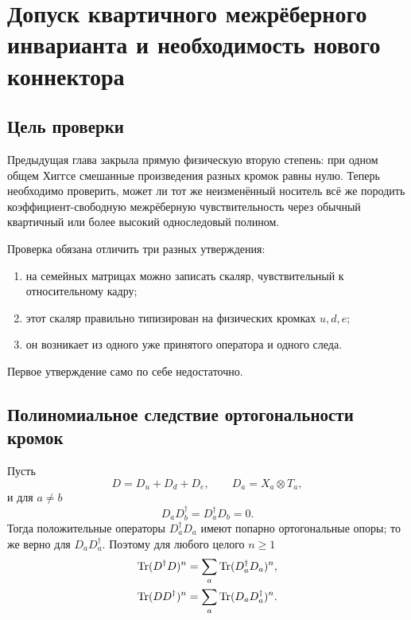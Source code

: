 \chapter{Допуск квартичного межрёберного инварианта и необходимость нового коннектора}

\section{Цель проверки}

Предыдущая глава закрыла прямую физическую вторую степень: при одном общем
Хиггсе смешанные произведения разных кромок равны нулю. Теперь необходимо
проверить, может ли тот же неизменённый носитель всё же породить
коэффициент-свободную межрёберную чувствительность через обычный
квартичный или более высокий односледовый полином.

Проверка обязана отличить три разных утверждения:
\begin{enumerate}
 \item на семейных матрицах можно записать скаляр, чувствительный к
 относительному кадру;
 \item этот скаляр правильно типизирован на физических кромках $u,d,e$;
 \item он возникает из одного уже принятого оператора и одного следа.
\end{enumerate}
Первое утверждение само по себе недостаточно.

\section{Полиномиальное следствие ортогональности кромок}

Пусть
\begin{equation}
 D=D_u+D_d+D_e,
 \qquad
 D_a=X_a\otimes T_a,
 \label{eq:v7-quartic-total-edge-operator}
\end{equation}
и для $a\ne b$
\begin{equation}
 D_aD_b^\dagger=D_a^\dagger D_b=0.
 \label{eq:v7-quartic-input-orthogonality}
\end{equation}
Тогда положительные операторы $D_a^\dagger D_a$ имеют попарно
ортогональные опоры; то же верно для $D_aD_a^\dagger$. Поэтому для любого
целого $n\ge1$
\begin{align}
 \operatorname{Tr}(D^\dagger D)^n
 &=\sum_a\operatorname{Tr}(D_a^\dagger D_a)^n,\label{eq:v7-source-moment-splitting}\\
 \operatorname{Tr}(DD^\dagger)^n
 &=\sum_a\operatorname{Tr}(D_aD_a^\dagger)^n.
 \label{eq:v7-target-moment-splitting}
\end{align}

